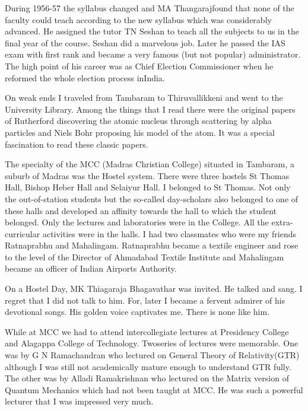 During 1956-57 the syllabus changed and MA Thangaraj\break found that none of 
the faculty could teach according to the new syllabus which was 
considerably advanced. He assigned the tutor TN Seshan to teach all the 
subjects to us in the final year of the course. Seshan did a marvelous 
job. Later he passed the IAS exam with first rank and became a very 
famous (but not popular) administrator. The high point of his career was 
as Chief Election\- Commissioner when he reformed the whole election 
process in\break India.

On weak ends I traveled from Tambaram to Thiruvallikkeni and went to 
the University Library. Among the things that I read there were the 
original papers of Rutherford discovering the atomic nucleus through 
scattering by alpha particles and Niels Bohr proposing his model of the 
atom. It was a special fascination to read these classic papers.
 
The specialty of the MCC (Madras Christian College) situated in 
Tambaram, a suburb of Madras was the Hostel system. There were three 
hostels St Thomas Hall, Bishop Heber Hall and Selaiyur Hall. I belonged 
to St Thomas. Not only the out-of-station students but the so-called 
day-scholars also belonged to one of these halls and developed an 
affinity towards the hall to which the student belonged. Only the 
lectures and laboratories were in the College. All the extra-curricular 
activities were in the halls. I had two classmates who were my friends 
Ratnaprabhu and Mahalingam. Ratnaprabhu became a textile engineer and 
rose to the level of the Director of Ahmadabad Textile Institute and 
Mahalingam became an officer of Indian Airports Authority.

On a Hostel Day, MK Thiagaraja Bhagavathar was invited. He talked and 
sang. I regret that I did not talk to him. For, later I became a fervent 
admirer of his devotional songs. His golden voice captivates me. There 
is none like him.
\eject

While at MCC we had to attend intercollegiate lectures at Presidency 
College and Alagappa College of Technology. Two\break series of lectures were 
memorable. One was by G N Rama\-chandran who lectured on General Theory of 
Relativity(GTR) although I was still not academically mature enough to 
understand GTR fully. The other was by Alladi Ramakrishnan who lectured 
on the Matrix version of Quantum Mechanics which had not been taught at 
MCC. He was such a powerful lecturer that I was impre\-ssed very much.
\smallskip

